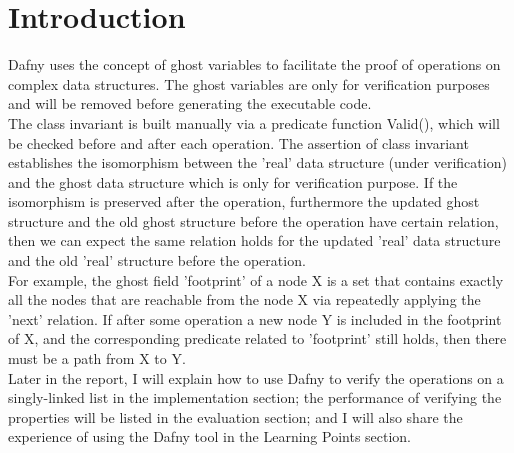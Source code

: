 \section*{Introduction}
Dafny uses the concept of ghost variables to facilitate the proof of operations on complex data structures. The ghost variables are only for verification purposes and will be removed before generating the executable code.\\

The class invariant is built manually via a predicate function Valid(), which will be checked before and after each operation. The assertion of class invariant establishes the isomorphism between the 'real' data structure (under verification) and the ghost data structure which is only for verification purpose. If the isomorphism is preserved after the operation, furthermore the updated ghost structure and the old ghost structure before the operation have certain relation, then we can expect the same relation holds for the updated 'real' data structure and the old 'real' structure before the operation.\\

For example, the ghost field 'footprint' of a node X is a set that contains exactly all the nodes that are reachable from the node X via repeatedly applying the 'next' relation. If after some operation a new node Y is included in the footprint of X, and the corresponding predicate related to 'footprint' still holds, then there must be a path from X to Y.\\

Later in the report, I will explain how to use Dafny to verify the operations on a singly-linked list in the implementation section; the performance of verifying the properties will be listed in the evaluation section; and I will also share the experience of using the Dafny tool in the Learning Points section.